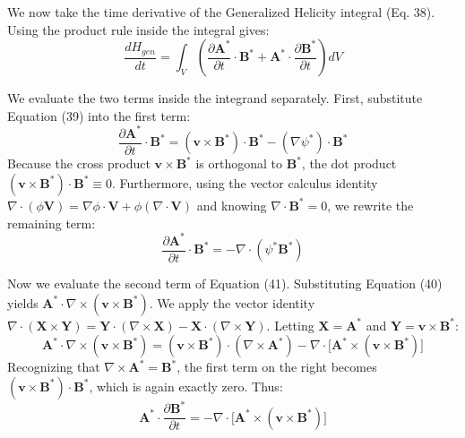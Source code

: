 \documentclass[11pt, a4paper]{article}
\begin{document}
We now take the time derivative of the Generalized Helicity integral (Eq. 38). Using the product rule inside the integral gives:
\begin{equation}
    \frac{d H_{gen}}{dt} = \int_V \left( \frac{\partial \mathbf{A}^*}{\partial t} \cdot \mathbf{B}^* + \mathbf{A}^* \cdot \frac{\partial \mathbf{B}^*}{\partial t} \right) dV
\end{equation}

We evaluate the two terms inside the integrand separately. First, substitute Equation (39) into the first term:
\begin{equation}
    \frac{\partial \mathbf{A}^*}{\partial t} \cdot \mathbf{B}^* = (\mathbf{v} \times \mathbf{B}^*) \cdot \mathbf{B}^* - (\nabla \psi^*) \cdot \mathbf{B}^*
\end{equation}
Because the cross product $\mathbf{v} \times \mathbf{B}^*$ is orthogonal to $\mathbf{B}^*$, the dot product $(\mathbf{v} \times \mathbf{B}^*) \cdot \mathbf{B}^* \equiv 0$. Furthermore, using the vector calculus identity $\nabla \cdot (\phi \mathbf{V}) = \nabla \phi \cdot \mathbf{V} + \phi (\nabla \cdot \mathbf{V})$ and knowing $\nabla \cdot \mathbf{B}^* = 0$, we rewrite the remaining term:
\begin{equation}
    \frac{\partial \mathbf{A}^*}{\partial t} \cdot \mathbf{B}^* = - \nabla \cdot (\psi^* \mathbf{B}^*)
\end{equation}

Now we evaluate the second term of Equation (41). Substituting Equation (40) yields $\mathbf{A}^* \cdot \nabla \times (\mathbf{v} \times \mathbf{B}^*)$. We apply the vector identity $\nabla \cdot (\mathbf{X} \times \mathbf{Y}) = \mathbf{Y} \cdot (\nabla \times \mathbf{X}) - \mathbf{X} \cdot (\nabla \times \mathbf{Y})$. Letting $\mathbf{X} = \mathbf{A}^*$ and $\mathbf{Y} = \mathbf{v} \times \mathbf{B}^*$:
\begin{equation}
    \mathbf{A}^* \cdot \nabla \times (\mathbf{v} \times \mathbf{B}^*) = (\mathbf{v} \times \mathbf{B}^*) \cdot (\nabla \times \mathbf{A}^*) - \nabla \cdot \Big[ \mathbf{A}^* \times (\mathbf{v} \times \mathbf{B}^*) \Big]
\end{equation}
Recognizing that $\nabla \times \mathbf{A}^* = \mathbf{B}^*$, the first term on the right becomes $(\mathbf{v} \times \mathbf{B}^*) \cdot \mathbf{B}^*$, which is again exactly zero. Thus:
\begin{equation}
    \mathbf{A}^* \cdot \frac{\partial \mathbf{B}^*}{\partial t} = - \nabla \cdot \Big[ \mathbf{A}^* \times (\mathbf{v} \times \mathbf{B}^*) \Big]
\end{equation}
\end{document}
